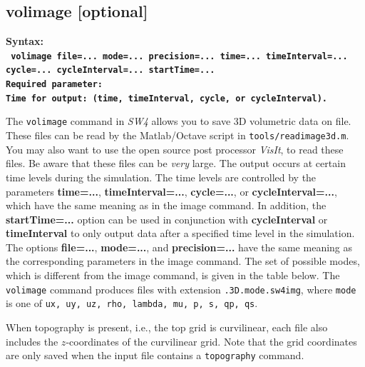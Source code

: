 \documentclass[11pt]{report}
\begin{document}
{\subsection{volimage [optional]}
\label{keyword:volimage}
\begin{flushleft}
	\bf Syntax:\\ \tt
	volimage file=... mode=... precision=...
	time=... timeInterval=... cycle=... cycleInterval=... startTime=... \\
	\bf Required parameter:\\
	\rm Time for output: (time, timeInterval, cycle, or cycleInterval).
\end{flushleft}
%
The \verb+volimage+ command in \emph{SW4} allows you to save 3D volumetric data on file. These files
can be read by the Matlab/Octave script in \verb+tools/readimage3d.m+. You may also want to use the
open source post processor \emph{VisIt}, to read these files. Be aware that these files can be {\em
		very} large. The output occurs at certain time levels during the simulation. The time levels are
controlled by the parameters {\bf time=...}, {\bf timeInterval=...}, {\bf cycle=...}, or {\bf
		cycleInterval=...}, which have the same meaning as in the image command. In addition, the {\bf
		startTime=...} option can be used in conjunction with {\bf cycleInterval} or {\bf timeInterval} to
only output data after a specified time level in the simulation. The options {\bf file=...}, {\bf
		mode=...}, and {\bf precision=...} have the same meaning as the corresponding parameters in the
image command. The set of possible modes, which is different from the image command, is given in the
table below. The \verb+volimage+ command produces files with extension \verb+.3D.mode.sw4img+, where
\verb+mode+ is one of \verb+ux, uy, uz, rho, lambda, mu, p, s, qp, qs+.

When topography is present, i.e., the top grid is curvilinear, each file also includes the
$z$-coordinates of the curvilinear grid. Note that the grid coordinates are only saved when the
input file contains a \verb+topography+ command.

}
\end{document}
